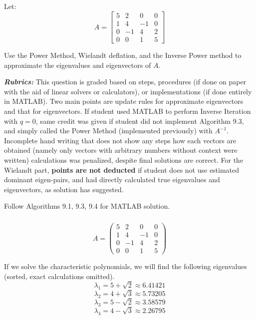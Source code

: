 \documentclass[12pt]{article} %
\newcommand{\1}[1]{\mathds{1}\left[#1\right]}
\begin{document}
\subsection{}
Let:
$$
	A = 
	\begin{bmatrix}
		5 & 2 & 0 & 0\\
		1 & 4 & -1 & 0 \\
		0 & -1 & 4 & 2\\
		0 & 0 & 1 & 5
	\end{bmatrix}
$$ 

Use the Power Method, Wielandt deflation, and the Inverse Power method to approximate the eigenvalues and eigenvectors of $A$.

\textbf{\emph{Rubrics:}} This question is graded based on steps, procedures (if done on paper with the aid of linear solvers or calculators), or implementations (if done entirely in MATLAB). Two main points are update rules for approximate eigenvectors and that for eigenvectors. If student used MATLAB to perform Inverse Iteration with $q=0$, same credit was given if student did not implement Algorithm 9.3, and simply called the Power Method (implemented previously) with $A^{-1}$. Incomplete hand writing that does not show any steps how each vectors are obtained (namely only vectors with arbitrary numbers without context were written) calculations was penalized, despite final solutions are correct. For the Wielandt part, {\bf{points are not deducted}} if student does not use estimated dominant eigen-pairs, and had directly calculated true eigenvalues and eigenvectors, as solution has suggested.

Follow Algorithms 9.1, 9.3, 9.4 for MATLAB solution.

\subsubsection{}
$$
	A = \begin{pmatrix}
		5 & 2 & 0 & 0 \\
		1 & 4 & -1 & 0\\
		0 & -1 & 4 & 2\\
		0 & 0 & 1 & 5
	\end{pmatrix}
$$

If we solve the characteristic polynomials, we will find the following eigenvalues (sorted, exact calculations omitted).
$$
	\lambda_1 = 5+\sqrt{2} \approx 6.41421
$$
$$
	\lambda_2 = 4+\sqrt{3} \approx 5.73205
$$
$$
	\lambda_3 = 5-\sqrt{2} \approx 3.58579
$$
$$
	\lambda_4 = 4-\sqrt{3} \approx 2.26795
$$
\end{document}
